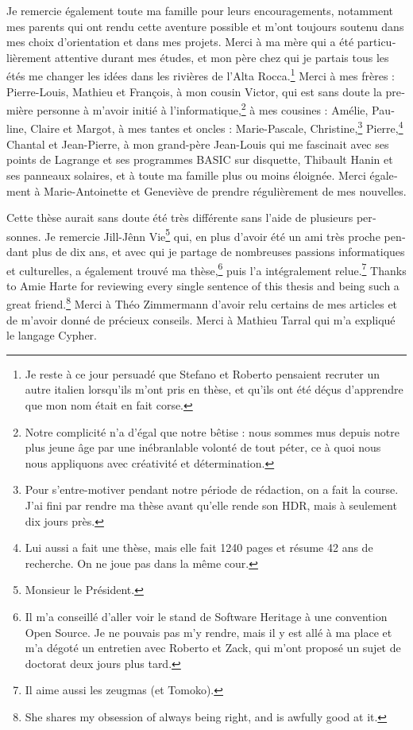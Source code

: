 \begin{otherlanguage}{french}
\begin{SingleSpace}
  Je remercie également toute ma famille pour leurs encouragements, notamment
  mes parents qui ont rendu cette aventure possible et m'ont toujours soutenu
  dans mes choix d'orientation et dans mes projets. Merci à ma mère qui a été
  particulièrement attentive durant mes études, et mon père chez qui je partais
  tous les étés me changer les idées dans les rivières de l'Alta
  Rocca.\footnote{Je reste à ce jour persuadé que Stefano et Roberto pensaient
  recruter un autre italien lorsqu'ils m'ont pris en thèse, et qu'ils ont été
  déçus d'apprendre que mon nom était en fait corse.}
  Merci à mes frères : Pierre-Louis, Mathieu et François,
  à mon cousin Victor,
  qui est sans doute la première personne à m'avoir initié à
  l'informatique,\footnote{Notre complicité n'a d'égal que notre bêtise : nous
  sommes mus depuis notre plus jeune âge par une inébranlable volonté de tout
  péter, ce à quoi nous nous appliquons avec créativité et détermination.}
  à mes cousines : Amélie, Pauline, Claire et Margot,
  à mes tantes et oncles : Marie-Pascale, Christine,\footnote{Pour
  s'entre-motiver pendant notre période de rédaction, on a fait la course. J'ai
  fini par rendre ma thèse avant qu'elle rende son HDR, mais à seulement dix
  jours près.} Pierre,\footnote{Lui aussi a fait une thèse, mais elle fait 1240
  pages et résume 42 ans de recherche. On ne joue pas dans la même cour.}
  Chantal et Jean-Pierre, à mon grand-père Jean-Louis qui me fascinait
  avec ses points de Lagrange et ses programmes BASIC sur disquette, Thibault
  Hanin et ses panneaux solaires, et à toute ma famille plus ou moins éloignée.
  Merci également à Marie-Antoinette et Geneviève de prendre régulièrement de
  mes nouvelles.

  Cette thèse aurait sans doute été très différente sans l'aide de plusieurs
  personnes. Je remercie Jill-Jênn Vie\footnote{Monsieur le Président.} qui, en
  plus d'avoir été un ami très proche pendant plus de dix ans, et avec qui je
  partage de nombreuses passions informatiques et culturelles, a également
  trouvé ma thèse,\footnote{Il m'a conseillé d'aller voir le stand de Software
  Heritage à une convention Open Source. Je ne pouvais pas m'y rendre, mais il
  y est allé à ma place et m'a dégoté un entretien avec Roberto et Zack, qui
  m'ont proposé un sujet de doctorat deux jours plus tard.} puis l'a
  intégralement relue.\footnote{Il aime aussi les zeugmas (et Tomoko).}
  Thanks to Amie Harte for reviewing every single sentence of this thesis and
  being such a great friend.\footnote{She shares my obsession of always being
  right, and is awfully good at it.} Merci à Théo Zimmermann d'avoir relu
  certains de mes articles et de m'avoir donné de précieux conseils. Merci à
  Mathieu Tarral qui m'a expliqué le langage Cypher.


\end{SingleSpace}
\end{otherlanguage}

